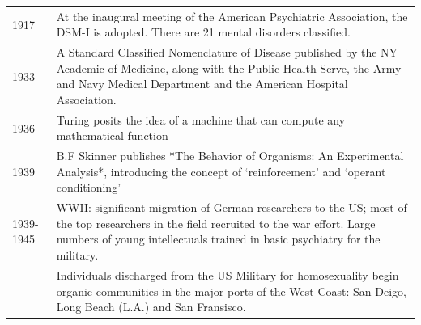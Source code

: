 \begin{longtable}[!t]{ | p{2cm} | p{11.8cm} | }
1917&At the inaugural meeting of the American Psychiatric Association, the DSM-I is adopted.  There are 21 mental disorders classified.  \\
1933&A Standard Classified Nomenclature of Disease published by the NY Academic of Medicine, along with the Public Health Serve, the Army and Navy Medical Department and the American Hospital Association.  \\
1936&Turing posits the idea of a machine that can compute any mathematical function \\
1939&B.F Skinner publishes *The Behavior of Organisms: An Experimental Analysis*, introducing the concept of ‘reinforcement’ and ‘operant conditioning’ \\

1939-1945& WWII: significant migration of German researchers to the US; most of the top researchers in the field recruited to the war effort. Large numbers of young intellectuals trained in basic psychiatry for the military. \\
 &Individuals discharged from the US Military for homosexuality begin organic communities in the major ports of the West Coast: San Deigo, Long Beach (L.A.) and San Fransisco. \\


\end{longtable}

